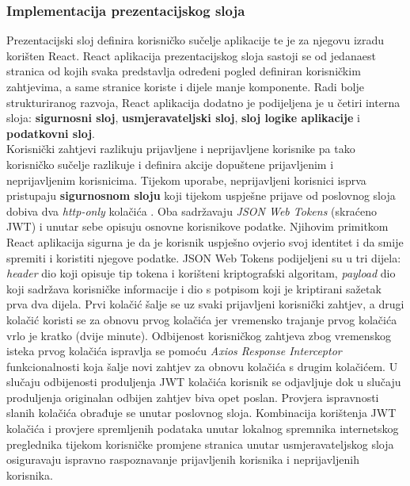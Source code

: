 \documentclass[times, utf8, zavrsni]{fer}
\begin{document}
			\subsubsection{Implementacija prezentacijskog sloja}
			Prezentacijski sloj definira korisničko sučelje aplikacije te je za njegovu izradu korišten React. React aplikacija prezentacijskog sloja sastoji se od jedanaest stranica od kojih svaka predstavlja određeni pogled definiran korisničkim zahtjevima, a same stranice koriste i dijele manje komponente. Radi bolje strukturiranog razvoja, React aplikacija dodatno je podijeljena je u četiri interna sloja: \textbf{sigurnosni sloj}, \textbf{usmjeravateljski sloj}, \textbf{sloj logike aplikacije} i \textbf{podatkovni sloj}.\\
			Korisnički zahtjevi razlikuju prijavljene i neprijavljene korisnike pa tako korisničko sučelje razlikuje i definira akcije dopuštene prijavljenim i neprijavljenim korisnicima. Tijekom uporabe, neprijavljeni korisnici isprva pristupaju \textbf{sigurnosnom sloju} koji tijekom uspješne prijave od poslovnog sloja dobiva dva \textit{http-only} kolačića . Oba sadržavaju \textit{JSON Web Tokens} (skraćeno JWT) i unutar sebe opisuju osnovne korisnikove podatke. Njihovim primitkom React aplikacija sigurna je da je korisnik uspješno ovjerio svoj identitet i da smije spremiti i koristiti njegove podatke.
		 	JSON Web Tokens podijeljeni su u tri dijela: \textit{header} dio koji opisuje tip tokena i korišteni kriptografski algoritam, \textit{payload} dio koji sadržava korisničke informacije 
			i dio s potpisom koji je kriptirani sažetak prva dva dijela. Prvi kolačić šalje se uz svaki prijavljeni korisnički zahtjev, a drugi kolačić koristi se za obnovu prvog kolačića jer vremensko trajanje prvog kolačića vrlo je kratko (dvije minute). Odbijenost korisničkog zahtjeva zbog vremenskog isteka prvog kolačića ispravlja se pomoću \textit{Axios Response Interceptor} funkcionalnosti koja šalje novi zahtjev za obnovu kolačića s drugim kolačićem. U slučaju odbijenosti produljenja JWT kolačića korisnik se odjavljuje dok u slučaju produljenja originalan odbijen zahtjev biva opet poslan. Provjera ispravnosti slanih kolačića obrađuje se unutar poslovnog sloja. Kombinacija korištenja JWT kolačića i provjere spremljenih podataka unutar lokalnog spremnika internetskog preglednika tijekom korisničke promjene stranica unutar usmjeravateljskog sloja osiguravaju ispravno raspoznavanje prijavljenih korisnika i neprijavljenih korisnika.
\end{document}
